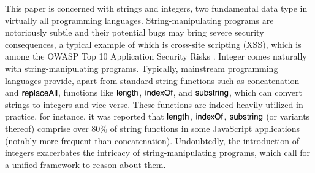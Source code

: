 
This paper is concerned with strings and integers, two fundamental data type in virtually all programming languages.
String-manipulating programs are notoriously subtle and their potential bugs %
may bring severe security consequences, a typical example of which is cross-site scripting
(XSS), which is among the OWASP Top 10 Application Security Risks
\cite{owasp17}. Integer comes naturally with string-manipulating programs. %
Typically, mainstream programming languages provide, apart from standard string functions such as concatenation and $\mathsf{replaceAll}$, %
functions like $\mathsf{length}$, $\mathsf{indexOf}$, and $\mathsf{substring}$, which can convert strings to integers and vice verse. %
These functions are indeed heavily utilized in practice, for instance, it was reported \cite{Berkeley-JavaScript} that $\mathsf{length}$, $\mathsf{indexOf}$, $\mathsf{substring}$ (or variants thereof) comprise over 80\% of string functions in some JavaScript applications (notably more frequent than concatenation). Undoubtedly, the introduction of integers exacerbates the intricacy of string-manipulating programs, which call for a unified 
framework to reason about them. 







